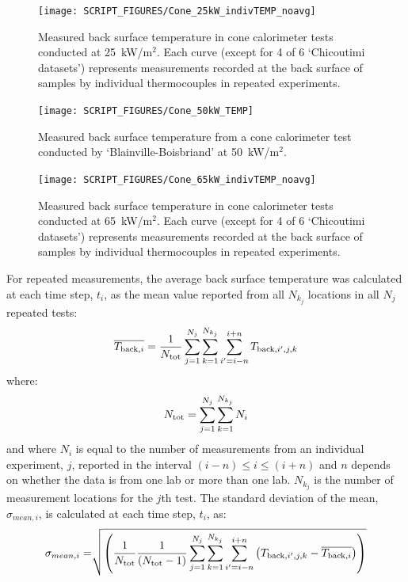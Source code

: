 \documentclass{book}
\begin{document}
\begin{figure}[p]
  \centering
  \texttt{[image: SCRIPT\_FIGURES/Cone\_25kW\_indivTEMP\_noavg]}
  \caption{Measured back surface temperature in cone calorimeter tests conducted at 25~kW/m$^2$. Each curve (except for 4 of 6 ‘Chicoutimi datasets’) represents measurements recorded at the back surface of samples by individual thermocouples in repeated experiments.}
  \label{Fig:Cone_25kWindivTEMP}
\end{figure}

\begin{figure}
  \centering
  \texttt{[image: SCRIPT\_FIGURES/Cone\_50kW\_TEMP]}
  \caption{Measured back surface temperature from a cone calorimeter test conducted by ‘Blainville-Boisbriand’ at 50~kW/m$^2$.}
  \label{Fig:Cone_50kWindivTEMP}
\end{figure}

\begin{figure}
  \centering
  \texttt{[image: SCRIPT\_FIGURES/Cone\_65kW\_indivTEMP\_noavg]}
  \caption{Measured back surface temperature in cone calorimeter tests conducted at 65~kW/m$^2$. Each curve (except for 4 of 6 ‘Chicoutimi datasets’) represents measurements recorded at the back surface of samples by individual thermocouples in repeated experiments.}
  \label{Fig:Cone_65kWindivTEMP}
\end{figure}


For repeated measurements, the average back surface temperature was calculated at each time step, $t_i$, as the mean value reported from all $N_{k_j}$ locations in all $N_j$ repeated tests:
\begin{equation}
  \overline{ T_{{\rm back},i} } = \frac{1}{N_{\rm tot}} \sum_{j=1}^{N_j} \sum_{k=1}^{N_{k_j}} \sum_{i'=i-n}^{i+n} T_{{\rm back},i',j,k}
\end{equation}
where:
\begin{equation}
N_{\rm tot}={\sum_{j=1}^{N_j}\sum_{k=1}^{N_{k_j}}N_i}
\end{equation}
and where $N_i$ is equal to the number of measurements from an individual experiment, $j$, reported in the interval $(i-n) \leq i \leq (i+n)$ and $n$ depends on whether the data is from one lab or more than one lab. $N_{k_j}$ is the number of measurement locations for the $j$th test. The standard deviation of the mean, $\sigma_{mean,i}$, is calculated at each time step, $t_i$, as:
\begin{equation}
   \sigma_{mean,i} = \sqrt[]{\left( \frac{1}{N_{\rm tot}} \frac{1}{(N_{\rm tot}-1)}
    \sum_{j=1}^{N_j} \sum_{k=1}^{N_{k_j}} \sum_{i'=i-n}^{i+n} \left( T_{{\rm back},i',j,k} - \overline{ T_{{\rm back},i} }  \right) \right)}
\end{equation}
\end{document}
